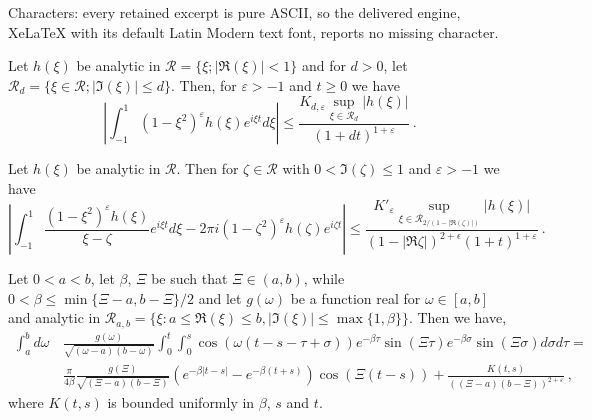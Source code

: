 \documentclass[10pt,a4paper]{amsart}
\newcommand{\dam}{\beta}
\newcommand{\e}{\varepsilon}
\begin{document}
Characters: every retained excerpt is pure ASCII, so the delivered engine, XeLaTeX with its default Latin Modern text font, reports no missing character.
\begin{lemma}\label{lem:stima} 
Let $h(\xi)$ be analytic in $\mathcal R=\{\xi; |\Re(\xi)|< 1\}$ and for $d>0$, let $\mathcal R_d=\{\xi\in \mathcal R;
|\Im(\xi)|\leq d\}$. Then, for $\e>-1$ and $t\ge 0$ we have
\begin{equation}\label{eq:fint}
\left |\int_{-1}^1 (1-\xi^2)^{\e}h(\xi)e^{i \xi t}d\xi\right|\leq
\frac{K_{d,\e}\sup_{\xi\in \mathcal R_d}|h(\xi)|}{\left(1+dt\right)^{1+\e}}\ .
\end{equation}

\end{lemma}

\begin{coro}\label{cor:stimasing}
 Let $h(\xi)$ be analytic in $\mathcal R$. Then for $\zeta\in \mathcal R$ with $0<\Im(\zeta)\leq 1$ and $\e>-1$ we have
\begin{equation}\label{eq:fintsing}
\left |\int_{-1}^1 \frac{(1-\xi^2)^{\e}h(\xi)}{\xi-\zeta}e^{i
\xi t}d\xi-2\pi i(1-\zeta^2)^\e h(\zeta)e^{i\zeta t}\right|\leq
\frac{K'_{\e}\sup_{\xi\in
\mathcal R_{2/(1-|\Re(\zeta)|)}}|h(\xi)|}{(1-|\Re{\zeta}|)^{2+\epsilon}(1+t)^{1+\e}}\ .
\end{equation}
\end{coro}

\begin{lemma}\label{lem:duhamel}
Let $0<a<b$, let $\dam$, $\Xi$ be such that $\Xi\in(a,b)$, while $0<\dam\leq \min\{\Xi-a,b-\Xi\}/2$ and let $g(\omega)$ be a function real for
$\omega\in [a,b]$ and analytic in $\mathcal R_{a,b}= \{\xi: a\le
\Re(\xi)\le b, |\Im(\xi)|\le \max\{1,\dam\}\}$. Then we have,
\begin{equation}\label{eq:duha}
\begin{aligned}
 \int_{a}^{b}d\omega\, &\frac{g(\omega)}{\sqrt{(\omega-a)(b-\omega)}} 
 \int_0^t\int_0^s\cos(\omega(t-s-\tau+\sigma))
 e^{-\dam \tau}\sin(\Xi\tau)e^{-\dam\sigma}\sin(\Xi\sigma)d\sigma d\tau=\\
&\frac{\pi}{4\dam}\frac{g(\Xi)}{\sqrt{(\Xi-a)(b-\Xi)}}  
\left(e^{-\dam|t-s|}-e^{-\dam(t+s)}\right)\cos(\Xi(t-s))+
\frac{K(t,s)}{\left((\Xi-a)(b-\Xi)\right)^{2+\e}}\ ,
\end{aligned}
\end{equation}
where $K(t,s)$ is bounded uniformly in $\beta$, $s$ and $t$.
\end{lemma}
\end{document}

